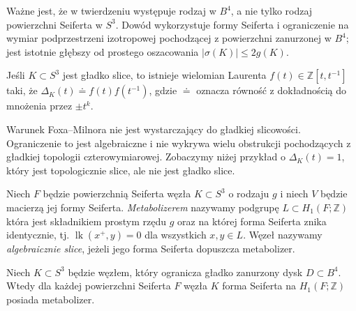 \begin{uwaga}
Ważne jest, że w twierdzeniu występuje rodzaj w $B^4$,
a nie tylko rodzaj powierzchni Seiferta w $S^3$.
Dowód wykorzystuje formy Seiferta i ograniczenie
na wymiar podprzestrzeni izotropowej pochodzącej
z powierzchni zanurzonej w $B^4$; jest istotnie głębszy
od prostego oszacowania $|\sigma(K)|\leq2g(K)$.
\end{uwaga}

\begin{twierdzenie}
Jeśli $K\subset S^3$ jest gładko slice, to istnieje
wielomian Laurenta $f(t)\in\mathbb Z[t,t^{-1}]$ taki, że
$\Delta_K(t)\doteq f(t)f(t^{-1})$,
gdzie $\doteq$ oznacza równość z dokładnością do
mnożenia przez $\pm t^k$.
\end{twierdzenie}

\begin{uwaga}
Warunek Foxa--Milnora nie jest wystarczający do gładkiej
slicowości. Ograniczenie to jest algebraiczne i nie wykrywa
wielu obstrukcji pochodzących z gładkiej topologii
czterowymiarowej. Zobaczymy niżej przykład o
$\Delta_K(t)=1$, który jest topologicznie slice,
ale nie jest gładko slice.
\end{uwaga}

\begin{definicja}
Niech $F$ będzie powierzchnią Seiferta węzła $K\subset S^3$
o rodzaju $g$ i niech $V$ będzie macierzą jej formy Seiferta.
\emph{Metabolizerem} nazywamy podgrupę $L\subset H_1(F;\mathbb Z)$
która jest składnikiem prostym rzędu $g$ oraz na której
forma Seiferta znika identycznie, tj.
$\operatorname{lk}(x^+,y)=0$ dla wszystkich $x,y\in L$.
Węzeł nazywamy \emph{algebraicznie slice}, jeżeli jego
forma Seiferta dopuszcza metabolizer.
\end{definicja}

\begin{twierdzenie}
Niech $K\subset S^3$ będzie węzłem, który ogranicza gładko
zanurzony dysk $D\subset B^4$. Wtedy dla każdej powierzchni
Seiferta $F$ węzła $K$ forma Seiferta na $H_1(F;\mathbb Z)$
posiada metabolizer.
\end{twierdzenie}

